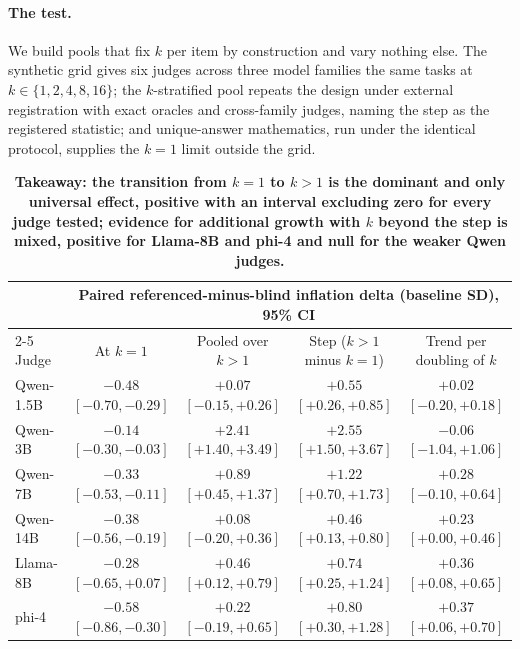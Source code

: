 \documentclass[11pt]{article}
\begin{document}
\paragraph{The test.}
We build pools that fix $k$ per item by construction and vary nothing else.
The synthetic grid gives six judges across three model families the same tasks at $k \in \{1,2,4,8,16\}$; the $k$-stratified pool repeats the design under external registration with exact oracles and cross-family judges, naming the step as the registered statistic; and unique-answer mathematics, run under the identical protocol, supplies the $k{=}1$ limit outside the grid.

\begin{table}[tbp]
\centering
\small
\setlength{\tabcolsep}{4pt}
\begin{tabular}{lcccc}
\toprule
& \multicolumn{4}{c}{Paired referenced-minus-blind inflation delta (baseline SD), 95\% CI} \\
\cmidrule(lr){2-5}
Judge & At $k{=}1$ & Pooled over $k{>}1$ & Step ($k{>}1$ minus $k{=}1$) & Trend per doubling of $k$ \\
\midrule
Qwen-1.5B & $-0.48$ {\scriptsize$[-0.70,-0.29]$} & $+0.07$ {\scriptsize$[-0.15,+0.26]$} & $+0.55$ {\scriptsize$[+0.26,+0.85]$} & $+0.02$ {\scriptsize$[-0.20,+0.18]$} \\
Qwen-3B   & $-0.14$ {\scriptsize$[-0.30,-0.03]$} & $+2.41$ {\scriptsize$[+1.40,+3.49]$} & $+2.55$ {\scriptsize$[+1.50,+3.67]$} & $-0.06$ {\scriptsize$[-1.04,+1.06]$} \\
Qwen-7B   & $-0.33$ {\scriptsize$[-0.53,-0.11]$} & $+0.89$ {\scriptsize$[+0.45,+1.37]$} & $+1.22$ {\scriptsize$[+0.70,+1.73]$} & $+0.28$ {\scriptsize$[-0.10,+0.64]$} \\
Qwen-14B  & $-0.38$ {\scriptsize$[-0.56,-0.19]$} & $+0.08$ {\scriptsize$[-0.20,+0.36]$} & $+0.46$ {\scriptsize$[+0.13,+0.80]$} & $+0.23$ {\scriptsize$[+0.00,+0.46]$} \\
Llama-8B  & $-0.28$ {\scriptsize$[-0.65,+0.07]$} & $+0.46$ {\scriptsize$[+0.12,+0.79]$} & $+0.74$ {\scriptsize$[+0.25,+1.24]$} & $+0.36$ {\scriptsize$[+0.08,+0.65]$} \\
phi-4     & $-0.58$ {\scriptsize$[-0.86,-0.30]$} & $+0.22$ {\scriptsize$[-0.19,+0.65]$} & $+0.80$ {\scriptsize$[+0.30,+1.28]$} & $+0.37$ {\scriptsize$[+0.06,+0.70]$} \\
\bottomrule
\end{tabular}
\caption{\textbf{Takeaway: the transition from $k{=}1$ to $k{>}1$ is the dominant and only universal effect, positive with an interval excluding zero for every judge tested; evidence for additional growth with $k$ beyond the step is mixed, positive for Llama-8B and phi-4 and null for the weaker Qwen judges.}
}
\end{table}
\end{document}
